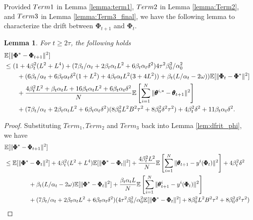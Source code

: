 \documentclass{article} %
\theoremstyle{plain}
\newtheorem{lemma}[theorem]{Lemma}
\theoremstyle{definition}
\theoremstyle{remark}
\begin{document}
{Provided $\textnormal{Term 1}$ in Lemma \ref{lemma:term1}, $\textnormal{Term 2}$ in Lemma \ref{lemma:Term2}, and $\textnormal{Term 3}$ in Lemma \ref{lemma:Term3_final}, we have the following lemma to characterize the drift between $\pmb{\Phi}_{t+1}$ and $\pmb{\Phi}_t$.
\begin{lemma}
For $t\geq 2\tau$, the following holds
\begin{align*}
  &\mathbb{E}[\|\pmb{\Phi}^*-\pmb{\Phi}_{t+1}\|^2]\allowdisplaybreaks\\
  &\leq(1+4\beta_t^2(L^2+L^4)+(7\beta_t/\alpha_t+2\beta_t\alpha_tL^2+6\beta_t\alpha_t\delta^2)4\tau^2\beta_0^2/\alpha_0^2\nonumber\allowdisplaybreaks\\
    &\qquad+(6\beta_t/\alpha_t+6\beta_t\alpha_t\delta^2(1+L^2) +4\beta_t\alpha_tL^2(3+4L^2))+\beta_t(L/\alpha_t-2\omega))\mathbb{E}[\|\pmb{\Phi}_t-\pmb{\Phi}^*\|^2]\nonumber\allowdisplaybreaks\\
    &\qquad+\frac{4\beta_t^2L^2+\beta_t\alpha_tL+16\beta_t\alpha_t L^2+6\beta_t\alpha_t \delta^2}{N}\mathbb{E}\left[\sum_{i=1}^N\|\pmb{\theta}^{i,*}-\pmb{\theta}_{t+1}\|^2\right]\allowdisplaybreaks\\
    &\qquad+(7\beta_t/\alpha_t+2\beta_t\alpha_t L^2+6\beta_t\alpha_t\delta^2)(8\beta_0^2L^2B^2\tau^2 +8\beta_0^2\delta^2\tau^2)+4\beta_t^2\delta^2+11\beta_t\alpha_t\delta^2.
\end{align*}
\end{lemma}
\begin{proof}
Substituting $Term_1, Term_2$ and $Term_3$ back into Lemma \ref{lem:dfrit_phi}, we have 
\begin{align*}
  &\mathbb{E}[\|\pmb{\Phi}^*-\pmb{\Phi}_{t+1}\|^2]\nonumber\\
    &\leq\mathbb{E}[\|\pmb{\Phi}^*-\pmb{\Phi}_{t}\|^2]+4\beta_t^2(L^2+L^4)\mathbb{E}[\|\pmb{\Phi}^*-\pmb{\Phi}_t\|^2]+\frac{4\beta_t^2L^2}{N}\mathbb{E}\left[\sum_{i=1}^N\|\pmb{\theta}_{t+1}-y^i(\pmb{\Phi}_t)\|^2\right]+4\beta_t^2\delta^2\allowdisplaybreaks\\
    &\qquad\qquad+ \beta_t(L/\alpha_t-2\omega)\mathbb{E}[\|\pmb{\Phi}^*-\pmb{\Phi}_t\|^2]+\frac{\beta_t\alpha_tL}{N}\mathbb{E}\left[\sum_{i=1}^N \|\pmb{\theta}_{t+1}^i-y^i(\pmb{\Phi}_t)\|^2\right]\allowdisplaybreaks\\
    &\qquad\qquad+(7\beta_t/\alpha_t+2\beta_t\alpha_t L^2+6\beta_t\alpha_t\delta^2)(4\tau^2\beta_0^2/\alpha_0^2\mathbb{E}[\|\pmb{\Phi}^*-\pmb{\Phi}_{t}\|^2]+8\beta_0^2L^2B^2\tau^2 +8\beta_0^2\delta^2\tau^2)\allowdisplaybreaks\\

\end{align*}
\end{proof}}
\end{document}
